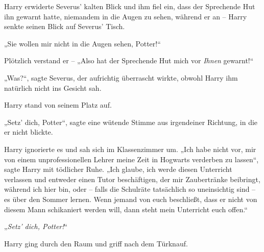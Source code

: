 Harry erwiderte Severus’ kalten Blick und ihm fiel ein, dass der Sprechende Hut ihn gewarnt hatte, niemandem in die Augen zu sehen, während er an – Harry senkte seinen Blick auf Severus’ Tisch.

„Sie wollen mir nicht in die Augen sehen, Potter!“

Plötzlich verstand er – „Also hat der Sprechende Hut mich vor \emph{Ihnen} gewarnt!“

„Was?“, sagte Severus, der aufrichtig überrascht wirkte, obwohl Harry ihm natürlich nicht ins Gesicht sah.

Harry stand von seinem Platz auf.

„Setz’ dich, Potter“, sagte eine wütende Stimme aus irgendeiner Richtung, in die er nicht blickte.

Harry ignorierte es und sah sich im Klassenzimmer um. „Ich habe nicht vor, mir von einem unprofessionellen Lehrer meine Zeit in Hogwarts verderben zu lassen“, sagte Harry mit tödlicher Ruhe. „Ich glaube, ich werde diesen Unterricht verlassen und entweder einen Tutor beschäftigen, der mir Zaubertränke beibringt, während ich hier bin, oder – falls die Schulräte tatsächlich so uneinsichtig sind – es über den Sommer lernen. Wenn jemand von euch beschließt, dass er nicht von diesem Mann schikaniert werden will, dann steht mein Unterricht euch offen.“

„\emph{Setz’ dich, Potter!}“

Harry ging durch den Raum und griff nach dem Türknauf.

